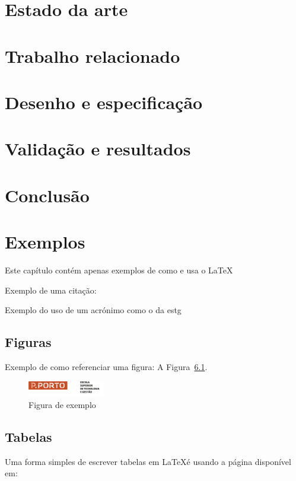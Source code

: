 \documentclass[12pt,a4paper,twoside]{report}
\begin{document}
\chapter{Estado da arte}

\chapter{Trabalho relacionado}

\chapter{Desenho e especificação}

\chapter{Validação e resultados}

\chapter{Conclusão}

\chapter{Exemplos}

Este capítulo contém apenas exemplos de como e usa o \LaTeX

Exemplo de uma citação: \cite{Pedro2019}

Exemplo do uso de um acrónimo como o da \gls{estg}

\section{Figuras}

Exemplo de como referenciar uma figura: A Figura~\ref{fig:exemplo}. 

\begin{figure}[h!]
    \centering
    \includegraphics[width=0.3\textwidth]{imagens/logo-ipp.png}
    \caption{Figura de exemplo}
    \label{fig:exemplo}
\end{figure}

\section{Tabelas}
Uma forma simples de escrever tabelas em \LaTeX é usando a página disponível em:
\end{document}
